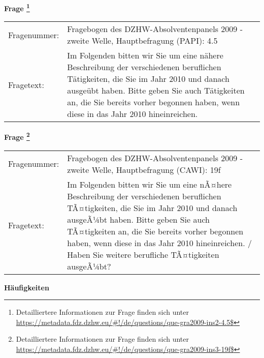 				\vspace*{0.5cm}
                \noindent\textbf{Frage
	                \footnote{Detailliertere Informationen zur Frage finden sich unter
		              \url{https://metadata.fdz.dzhw.eu/\#!/de/questions/que-gra2009-ins2-4.5$}}}\\
				\begin{tabularx}{\hsize}{@{}lX}
					Fragenummer: &
					  Fragebogen des DZHW-Absolventenpanels 2009 - zweite Welle, Hauptbefragung (PAPI):
					  4.5
 \\
					Fragetext: & Im Folgenden bitten wir Sie um eine nähere Beschreibung der verschiedenen beruflichen Tätigkeiten, die Sie im Jahr 2010 und danach ausgeübt haben. Bitte geben Sie auch Tätigkeiten an, die Sie bereits vorher begonnen haben, wenn diese in das Jahr 2010 hineinreichen. \\
				\end{tabularx}
				\vspace*{0.5cm}
                \noindent\textbf{Frage
	                \footnote{Detailliertere Informationen zur Frage finden sich unter
		              \url{https://metadata.fdz.dzhw.eu/\#!/de/questions/que-gra2009-ins3-19f$}}}\\
				\begin{tabularx}{\hsize}{@{}lX}
					Fragenummer: &
					  Fragebogen des DZHW-Absolventenpanels 2009 - zweite Welle, Hauptbefragung (CAWI):
					  19f
 \\
					Fragetext: & Im Folgenden bitten wir Sie um eine nÃ¤here Beschreibung der verschiedenen beruflichen TÃ¤tigkeiten, die Sie im Jahr 2010 und danach ausgeÃ¼bt haben. Bitte geben Sie auch TÃ¤tigkeiten an, die Sie bereits vorher begonnen haben, wenn diese in das Jahr 2010 hineinreichen. / Haben Sie weitere berufliche TÃ¤tigkeiten ausgeÃ¼bt? \\
				\end{tabularx}





        		\vspace*{0.5cm}
                \noindent\textbf{Häufigkeiten}

